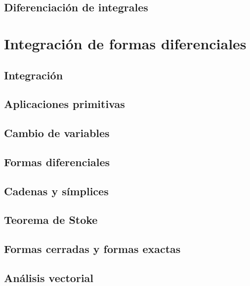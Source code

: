 \documentclass[12pt,]{krantz}
\theoremstyle{definition}
\theoremstyle{definition}
\theoremstyle{definition}
\theoremstyle{remark}
\begin{document}
\section{Diferenciación de
integrales}\label{diferenciacion-de-integrales}

\chapter{Integración de formas
diferenciales}\label{integracion-de-formas-diferenciales}

\section{Integración}\label{integracion}

\section{Aplicaciones primitivas}\label{aplicaciones-primitivas}

\section{Cambio de variables}\label{cambio-de-variables}

\section{Formas diferenciales}\label{formas-diferenciales}

\section{Cadenas y símplices}\label{cadenas-y-simplices}

\section{Teorema de Stoke}\label{teorema-de-stoke}

\section{Formas cerradas y formas
exactas}\label{formas-cerradas-y-formas-exactas}

\section{Análisis vectorial}\label{analisis-vectorial}
\end{document}
